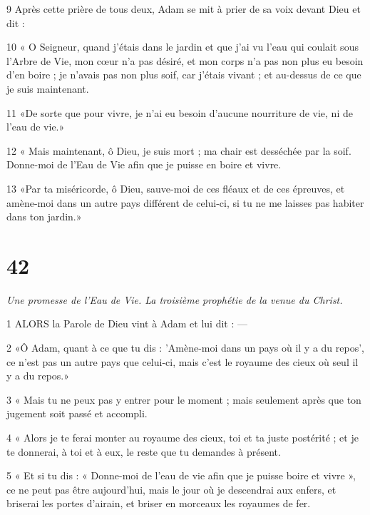 \par 9 Après cette prière de tous deux, Adam se mit à prier de sa voix devant Dieu et dit :

\par 10 « O Seigneur, quand j'étais dans le jardin et que j'ai vu l'eau qui coulait sous l'Arbre de Vie, mon cœur n'a pas désiré, et mon corps n'a pas non plus eu besoin d'en boire ; je n’avais pas non plus soif, car j’étais vivant ; et au-dessus de ce que je suis maintenant.

\par 11 «De sorte que pour vivre, je n'ai eu besoin d'aucune nourriture de vie, ni de l'eau de vie.»

\par 12 « Mais maintenant, ô Dieu, je suis mort ; ma chair est desséchée par la soif. Donne-moi de l'Eau de Vie afin que je puisse en boire et vivre.

\par 13 «Par ta miséricorde, ô Dieu, sauve-moi de ces fléaux et de ces épreuves, et amène-moi dans un autre pays différent de celui-ci, si tu ne me laisses pas habiter dans ton jardin.»

\chapter{42}

\par \textit{Une promesse de l'Eau de Vie. La troisième prophétie de la venue du Christ.}

\par 1 ALORS la Parole de Dieu vint à Adam et lui dit : —

\par 2 «Ô Adam, quant à ce que tu dis : 'Amène-moi dans un pays où il y a du repos', ce n'est pas un autre pays que celui-ci, mais c'est le royaume des cieux où seul il y a du repos.»

\par 3 « Mais tu ne peux pas y entrer pour le moment ; mais seulement après que ton jugement soit passé et accompli.

\par 4 « Alors je te ferai monter au royaume des cieux, toi et ta juste postérité ; et je te donnerai, à toi et à eux, le reste que tu demandes à présent.

\par 5 « Et si tu dis : « Donne-moi de l'eau de vie afin que je puisse boire et vivre », ce ne peut pas être aujourd'hui, mais le jour où je descendrai aux enfers, et briserai les portes d'airain, et briser en morceaux les royaumes de fer.

